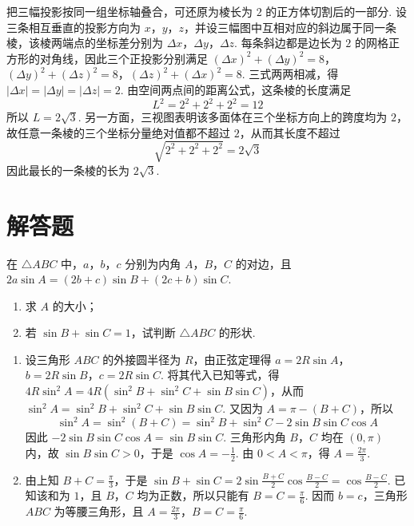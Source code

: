 \begin{solution}
把三幅投影按同一组坐标轴叠合，可还原为棱长为 \(2\) 的正方体切割后的一部分. 设三条相互垂直的投影方向为 \(x\)，\(y\)，\(z\)，并设三幅图中互相对应的斜边属于同一条棱，该棱两端点的坐标差分别为 \(\Delta x\)，\(\Delta y\)，\(\Delta z\). 每条斜边都是边长为 \(2\) 的网格正方形的对角线，因此三个正投影分别满足 \((\Delta x)^2+(\Delta y)^2=8\)，\((\Delta y)^2+(\Delta z)^2=8\)，\((\Delta z)^2+(\Delta x)^2=8\). 三式两两相减，得 \(|\Delta x|=|\Delta y|=|\Delta z|=2\). 由空间两点间的距离公式，这条棱的长度满足
\[
L^2=2^2+2^2+2^2=12
\]
所以 \(L=2\sqrt{3}\). 另一方面，三视图表明该多面体在三个坐标方向上的跨度均为 \(2\)，故任意一条棱的三个坐标分量绝对值都不超过 \(2\)，从而其长度不超过
\[
\sqrt{2^2+2^2+2^2}=2\sqrt{3}
\]
因此最长的一条棱的长为 \(2\sqrt{3}\).
\end{solution}

\section{解答题}

\begin{problem}
在 \(\triangle ABC\) 中，\(a\)，\(b\)，\(c\) 分别为内角 \(A\)，\(B\)，\(C\) 的对边，且 \(2a\sin A=(2b+c)\sin B+(2c+b)\sin C\).

\begin{enumerate}
\item 求 \(A\) 的大小；
\item 若 \(\sin B+\sin C=1\)，试判断 \(\triangle ABC\) 的形状.
\end{enumerate}
\end{problem}

\begin{solution}
\begin{enumerate}
\item 设三角形 \(ABC\) 的外接圆半径为 \(R\)，由正弦定理得 \(a=2R\sin A\)，\(b=2R\sin B\)，\(c=2R\sin C\). 将其代入已知等式，得 \(4R\sin^2 A=4R\left(\sin^2B+\sin^2C+\sin B\sin C\right)\)，从而 \(\sin^2 A=\sin^2B+\sin^2C+\sin B\sin C\). 又因为 \(A=\pi-(B+C)\)，所以
\[
\sin^2 A=\sin^2(B+C)=\sin^2B+\sin^2C-2\sin B\sin C\cos A
\]
因此 \(-2\sin B\sin C\cos A=\sin B\sin C\). 三角形内角 \(B\)，\(C\) 均在 \((0,\pi)\) 内，故 \(\sin B\sin C>0\)，于是 \(\cos A=-\frac{1}{2}\). 由 \(0<A<\pi\)，得 \(A=\frac{2\pi}{3}\).
\item 由上知 \(B+C=\frac{\pi}{3}\)，于是 \(\sin B+\sin C=2\sin\frac{B+C}{2}\cos\frac{B-C}{2}=\cos\frac{B-C}{2}\). 已知该和为 \(1\)，且 \(B\)，\(C\) 均为正数，所以只能有 \(B=C=\frac{\pi}{6}\). 因而 \(b=c\)，三角形 \(ABC\) 为等腰三角形，且 \(A=\frac{2\pi}{3}\)，\(B=C=\frac{\pi}{6}\).
\end{enumerate}
\end{solution}

